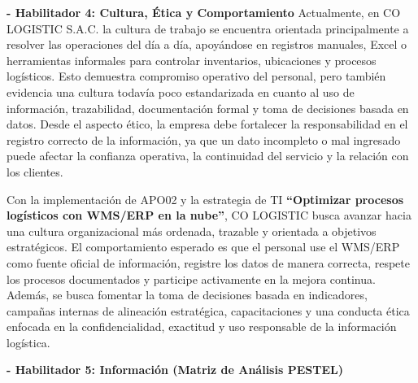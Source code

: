 \documentclass[11pt]{article}
\begin{document}
\textbf{- Habilitador 4: Cultura, Ética y Comportamiento}
Actualmente, en CO LOGISTIC S.A.C. la cultura de trabajo se encuentra orientada principalmente a resolver las operaciones del día a día, apoyándose en registros manuales, Excel o herramientas informales para controlar inventarios, ubicaciones y procesos logísticos. Esto demuestra compromiso operativo del personal, pero también evidencia una cultura todavía poco estandarizada en cuanto al uso de información, trazabilidad, documentación formal y toma de decisiones basada en datos. Desde el aspecto ético, la empresa debe fortalecer la responsabilidad en el registro correcto de la información, ya que un dato incompleto o mal ingresado puede afectar la confianza operativa, la continuidad del servicio y la relación con los clientes.

Con la implementación de APO02 y la estrategia de TI \textbf{``Optimizar procesos logísticos con WMS/ERP en la nube''}, CO LOGISTIC busca avanzar hacia una cultura organizacional más ordenada, trazable y orientada a objetivos estratégicos. El comportamiento esperado es que el personal use el WMS/ERP como fuente oficial de información, registre los datos de manera correcta, respete los procesos documentados y participe activamente en la mejora continua. Además, se busca fomentar la toma de decisiones basada en indicadores, campañas internas de alineación estratégica, capacitaciones y una conducta ética enfocada en la confidencialidad, exactitud y uso responsable de la información logística.

\textbf{- Habilitador 5: Información (Matriz de Análisis PESTEL)}
\end{document}
